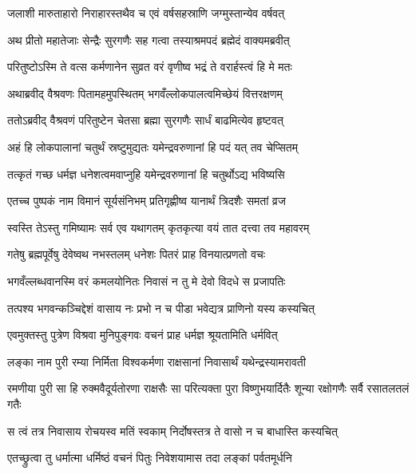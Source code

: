 \twolineshloka
{जलाशी मारुताहारो निराहारस्तथैव च}
{एवं वर्षसहस्राणि जग्मुस्तान्येव वर्षवत्} %

\twolineshloka
{अथ प्रीतो महातेजाः सेन्द्रैः सुरगणैः सह}
{गत्वा तस्याश्रमपदं ब्रह्मेदं वाक्यमब्रवीत्} %

\twolineshloka
{परितुष्टोऽस्मि ते वत्स कर्मणानेन सुव्रत}
{वरं वृणीष्व भद्रं ते वरार्हस्त्वं हि मे मतः} %

\twolineshloka
{अथाब्रवीद् वैश्रवणः पितामहमुपस्थितम्}
{भगवँल्लोकपालत्वमिच्छेयं वित्तरक्षणम्} %

\twolineshloka
{ततोऽब्रवीद् वैश्रवणं परितुष्टेन चेतसा}
{ब्रह्मा सुरगणैः सार्धं बाढमित्येव हृष्टवत्} %

\twolineshloka
{अहं हि लोकपालानां चतुर्थं स्रष्टुमुद्यतः}
{यमेन्द्रवरुणानां हि पदं यत् तव चेप्सितम्} %

\twolineshloka
{तत्कृतं गच्छ धर्मज्ञ धनेशत्वमवाप्नुहि}
{यमेन्द्रवरुणानां हि चतुर्थोऽद्य भविष्यसि} %

\twolineshloka
{एतच्च पुष्पकं नाम विमानं सूर्यसंनिभम्}
{प्रतिगृह्णीष्व यानार्थं त्रिदशैः समतां व्रज} %

\twolineshloka
{स्वस्ति तेऽस्तु गमिष्यामः सर्व एव यथागतम्}
{कृतकृत्या वयं तात दत्त्वा तव महावरम्} %

\twolineshloka
{गतेषु ब्रह्मपूर्वेषु देवेष्वथ नभस्तलम्}
{धनेशः पितरं प्राह विनयात्प्रणतो वचः} %

\twolineshloka
{भगवँल्लब्धवानस्मि वरं कमलयोनितः}
{निवासं न तु मे देवो विदधे स प्रजापतिः} %

\twolineshloka
{तत्पश्य भगवन्कञ्चिद्देशं वासाय नः प्रभो}
{न च पीडा भवेद्यत्र प्राणिनो यस्य कस्यचित्} %

\twolineshloka
{एवमुक्तस्तु पुत्रेण विश्रवा मुनिपुङ्गवः}
{वचनं प्राह धर्मज्ञ श्रूयतामिति धर्मवित्} %

\twolineshloka
{लङ्का नाम पुरी रम्या निर्मिता विश्वकर्मणा}
{राक्षसानां निवासार्थं यथेन्द्रस्यामरावती} %

\threelineshloka
{रमणीया पुरी सा हि रुक्मवैदूर्यतोरणा}
{राक्षसैः सा परित्यक्ता पुरा विष्णुभयार्दितैः}
{शून्या रक्षोगणैः सर्वै रसातलतलं गतैः} %

\twolineshloka
{स त्वं तत्र निवासाय रोचयस्व मतिं स्वकाम्}
{निर्दोषस्तत्र ते वासो न च बाधास्ति कस्यचित्} %

\twolineshloka
{एतच्छ्रुत्वा तु धर्मात्मा धर्मिष्ठं वचनं पितुः}
{निवेशयामास तदा लङ्कां पर्वतमूर्धनि} %

